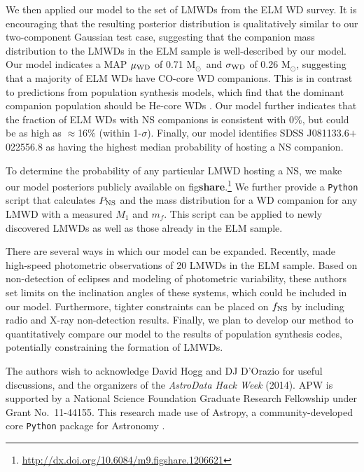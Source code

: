 \documentclass[apjl]{emulateapj}
\newcommand{\Msun}{\ifmmode {{\rm M}_{\odot}}\else M$_{\odot}$\fi}
\newcommand{\mf}{m_f}
\begin{document}
We then applied our model to the set of LMWDs from the ELM WD survey. It is encouraging that the resulting posterior distribution is qualitatively similar to our two-component Gaussian test case, suggesting that the companion mass distribution to the LMWDs in the ELM sample is well-described by our model. Our model indicates a MAP $\mu_{\rm WD}$ of 0.71 \Msun\ and $\sigma_{\rm WD}$ of 0.26 \Msun, suggesting that a majority of ELM WDs have CO-core WD companions. This is in contrast to predictions from population synthesis models, which find that the dominant companion population should be He-core WDs \citep[e.g.,][]{toonen12}. Our model further indicates that the fraction of ELM WDs with NS companions is consistent with 0\%, but could be as high as $\approx$16\% (within 1-$\sigma$). Finally, our model identifies SDSS J081133.6$+$022556.8 as having the highest median probability of hosting a NS companion.

To determine the probability of any particular LMWD hosting a NS, we make our model posteriors publicly available on fig{\bf share}.\footnote{\url{http://dx.doi.org/10.6084/m9.figshare.1206621}} We further provide a {\tt Python} script that calculates $P_{\rm NS}$ and the mass distribution for a WD companion for any LMWD with a measured $M_1$ and $\mf$. This script can be applied to newly discovered LMWDs as well as those already in the ELM sample.


There are several ways in which our model can be expanded. Recently, \citet{hermes14} made high-speed photometric observations of 20 LMWDs in the ELM sample. Based on non-detection of eclipses and modeling of photometric variability, these authors set limits on the inclination angles of these systems, which could be included in our model. Furthermore, tighter constraints can be placed on $f_{\rm NS}$ by including radio and X-ray non-detection results. Finally, we plan to develop our method to quantitatively compare our model to the results of population synthesis codes, potentially constraining the formation of LMWDs.



\acknowledgements
The authors wish to acknowledge David Hogg and DJ D'Orazio for useful discussions, and the organizers of the \emph{AstroData Hack Week} (2014). 
APW is supported by a National Science Foundation Graduate Research Fellowship under Grant No.\ 11-44155. 
This research made use of Astropy, a community-developed core \texttt{Python} package for Astronomy \citep{astropy13}. \\
\end{document}
